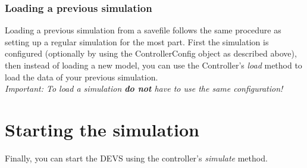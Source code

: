 \subsubsection{Loading a previous simulation}
Loading a previous simulation from a savefile follows the same procedure as setting up a regular simulation for the most part. First the simulation is configured (optionally by using the ControllerConfig object as described above), then instead of loading a new model, you can use the Controller's \textsl{load} method to load the data of your previous simulation.\\
\emph{Important: To load a simulation \textbf{do not} have to use the same configuration!}

\section{Starting the simulation}
Finally, you can start the DEVS using the controller's \textsl{simulate} method.